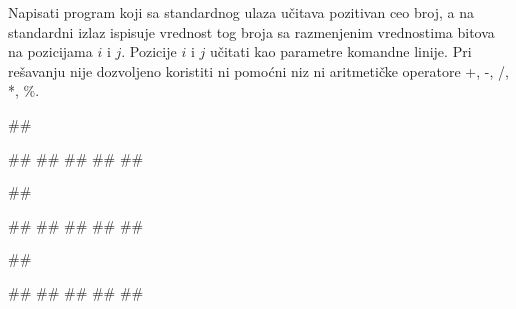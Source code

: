 \begin{Exercise}[difficulty=1, label=1_13]%
Napisati program koji sa standardnog ulaza učitava pozitivan ceo broj, a na standardni izlaz ispisuje vrednost tog broja sa razmenjenim vrednostima bitova na pozicijama $i$ i $j$. Pozicije $i$ i $j$ učitati kao parametre komandne linije. Pri rešavanju nije dozvoljeno koristiti ni pomoćni niz ni aritmetičke operatore +, -, /, *, \%.

\begin{minitest}
\begin{upotreba}{1}
##

#\naslovInt#
#\naslovUlaz#
##
#\naslovIzlaz#
##
\end{upotreba}
\end{minitest}
\begin{minitest}
\begin{upotreba}{2}
##

#\naslovInt#
#\naslovUlaz#
##
#\naslovIzlaz#
##
\end{upotreba}
\end{minitest}
\begin{minitest}
\begin{upotreba}{2}
##

#\naslovInt#
#\naslovUlaz#
##
#\naslovIzlaz#
##
\end{upotreba}
\end{minitest}

\end{Exercise}


